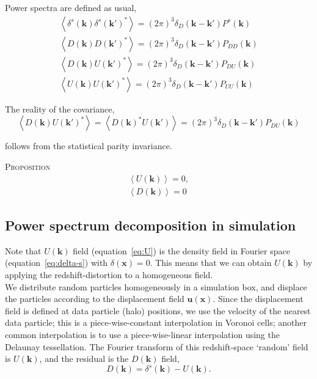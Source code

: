\documentclass[a4paper,11pt, fleqn]{article}
\begin{document}
\vspace{10mm}
Power spectra are defined as usual,
\begin{align}
  \left\langle \delta^s(\bm{k}) \delta^s(\bm{k}')^* \right\rangle
    = (2\pi)^3 \delta_D(\bm{k} - \bm{k}') P^s(\bm{k})\\
  \left\langle D(\bm{k}) D(\bm{k}')^* \right\rangle
    = (2\pi)^3 \delta_D(\bm{k} - \bm{k}') P_{DD}(\bm{k})\\
  \left\langle D(\bm{k}) U(\bm{k}')^* \right\rangle
    = (2\pi)^3 \delta_D(\bm{k} - \bm{k}') P_{DU}(\bm{k})\\
  \left\langle U(\bm{k}) U(\bm{k}')^* \right\rangle
    = (2\pi)^3 \delta_D(\bm{k} - \bm{k}') P_{UU}(\bm{k})
\end{align}

\vspace{10mm}
The reality of the covariance,
%
\begin{equation}
  \left\langle D(\bm{k}) U(\bm{k}')^* \right\rangle =
  \left\langle D(\bm{k})^* U(\bm{k}') \right\rangle =
  (2\pi)^3 \delta_D(\bm{k} - \bm{k}') P_{DU}(\bm{k})
\end{equation}

follows from the statistical parity invariance. 

\textsc{Proposition}
%
\begin{align}
  \left\langle U(\bm{k}) \right\rangle = 0,\\
  \left\langle D(\bm{k}) \right\rangle = 0
\end{align}


\newpage
\subsection{Power spectrum decomposition in simulation}

Note that $U(\bm{k})$ field (equation~\ref{eq:U}) is the density field
in Fourier space (equation~\ref{eq:delta-s}) with $\delta(\bm{x}) =
0$. This means that we can obtain $U(\bm{k})$ by applying the
redshift-distortion to a homogeneous field.\\

We distribute random particles homogeneously in a simulation box, and
displace the particles according to the displacement field
$\bm{u}(\bm{x})$. Since the displacement field is defined at data
particle (halo) positions, we use the velocity of the nearest data
particle; this is a piece-wise-constant interpolation in Voronoi
cells; another common interpolation is to use a piece-wise-linear
interpolation using the Delaunay tessellation. The Fourier transform
of this redshift-space `random' field is $U(\bm{k})$, and the residual
is the $D(\bm{k})$ field,
%
\begin{equation}
  D(\bm{k}) = \delta^s(\bm{k}) - U(\bm{k}).
\end{equation}
\end{document}
